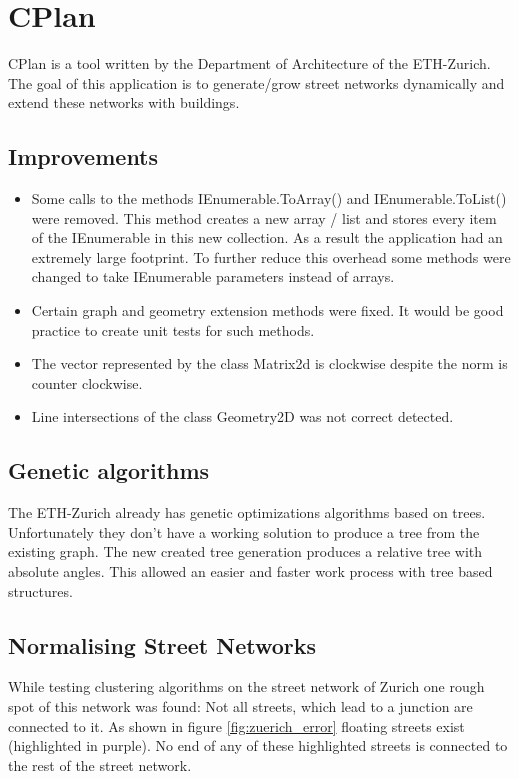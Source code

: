\chapter{CPlan}\label{CPlan}
CPlan is a tool written by the Department of Architecture of the ETH-Zurich. The goal of this application is to generate/grow street networks dynamically and extend these networks with buildings. 
\section{Improvements}
\begin{itemize}
    \item Some calls to the methods IEnumerable.ToArray() and IEnumerable.ToList() were removed. This method creates a new array / list and stores every item of the IEnumerable in this new collection. As a result the application had an extremely large footprint. To further reduce this overhead some methods were changed to take IEnumerable parameters instead of arrays.
    \item Certain graph and geometry extension methods were fixed. It would be good practice to create unit tests for such methods.
    \item The vector represented by the class Matrix2d is clockwise despite the norm is counter clockwise.
    \item Line intersections of the class Geometry2D was not correct detected. 
\end{itemize}

\section{Genetic algorithms}
The ETH-Zurich already has genetic optimizations algorithms based on trees. Unfortunately they don't have a working solution to produce a tree from the existing graph. The new created tree generation produces a relative tree with absolute angles. This allowed an easier and faster work process with tree based structures.

\pagebreak
\section{Normalising Street Networks}
While testing clustering algorithms on the street network of Zurich one rough spot of this network was found: Not all streets, which lead to a junction are connected to it. As shown in figure \ref{fig:zuerich_error} floating streets exist (highlighted in purple). No end of any of these highlighted streets is connected to the rest of the street network.

